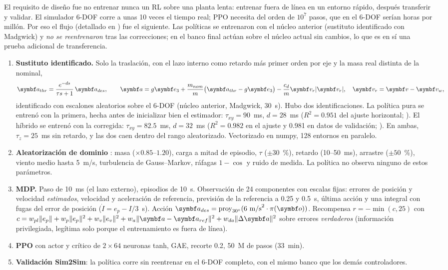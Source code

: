 El requisito de diseño fue no entrenar nunca un RL sobre una planta lenta:
entrenar fuera de línea en un entorno rápido, después transferir y validar.
El simulador 6-DOF corre a unas 10 veces el tiempo real; PPO necesita del
orden de $10^7$ pasos, que en el 6-DOF serían horas por millón. Por eso el
flujo (detallado en ) fue el siguiente. Las políticas se
entrenaron con el núcleo anterior (sustituto identificado con Madgwick) y
\emph{no se reentrenaron} tras las correcciones; en el banco final actúan
sobre el núcleo actual sin cambios, lo que es en sí una prueba adicional de
transferencia.

\begin{enumerate}
\item \textbf{Sustituto identificado.} Solo la traslación, con el lazo
interno como retardo más primer orden por eje y la masa real distinta de
la nominal,
\begin{equation}
\vect a_{thr}=\frac{e^{-d s}}{\tau s+1}\,\vect a_{des},\qquad
\vect a=g\eu+\frac{m_{nom}}{m}\big(\vect a_{thr}-g\eu\big)-\frac{c_d}{m}\vect v_r|\vect v_r|,\quad \vect v_r=\vect v-\vect v_w,
\label{eq:surrogate}
\end{equation}
identificado con escalones aleatorios sobre el 6-DOF (núcleo anterior,
Madgwick, 30~s). Hubo dos identificaciones. La política pura se entrenó con
la primera, hecha antes de inicializar bien el estimador:
$\tau_{xy}=90$~ms, $d=28$~ms ($R^2=0.951$ del ajuste horizontal;
). El
híbrido se entrenó con la corregida: $\tau_{xy}=82.5$~ms, $d=32$~ms
($R^2=0.982$ en el ajuste y 0.981 en datos de validación;
). En ambas, $\tau_z=25$~ms sin retardo, y
las dos caen dentro del rango aleatorizado. Vectorizado en numpy, 128
entornos en paralelo.
\item \textbf{Aleatorización de dominio} \cite{tobin17}: masa
($\times0.85$--$1.20$), carga a mitad de episodio, $\tau$ ($\pm30$~\%),
retardo (10--50~ms), arrastre ($\pm50$~\%), viento medio hasta 5~m/s,
turbulencia de Gauss--Markov, ráfagas $1-\cos$ y ruido de medida. La
política no observa ninguno de estos parámetros.
\item \textbf{MDP.} Paso de 10~ms (el lazo externo), episodios de 10~s.
Observación de 24 componentes con escalas fijas: errores de posición y
velocidad \emph{estimados}, velocidad y aceleración de referencia,
previsión de la referencia a 0.25 y 0.5~s, última acción y una integral con
fugas del error de posición ($\dot I=e_p-I/3$~s). Acción
$\vect a_{des}=\operatorname{proy}_{30^\circ}(6~\text{m/s}^2\cdot\pi(\vect o))$.
Recompensa $r=-\min(c,25)$ con
$c=w_{pl}\|e_p\|+w_p\|e_p\|^2+w_v\|e_v\|^2+w_a\|\vect a-\vect a_{ref}\|^2+w_{da}\|\Delta\vect a\|^2$
sobre errores \emph{verdaderos} (información privilegiada, legítima solo
porque el entrenamiento es fuera de línea).
\item \textbf{PPO} \cite{schulman17} con actor y crítico de $2\times64$
neuronas tanh, GAE, recorte 0.2, 50~M de pasos (33~min).
\item \textbf{Validación Sim2Sim}: la política corre sin reentrenar en el
6-DOF completo, con el mismo banco que los demás controladores.
\end{enumerate}

